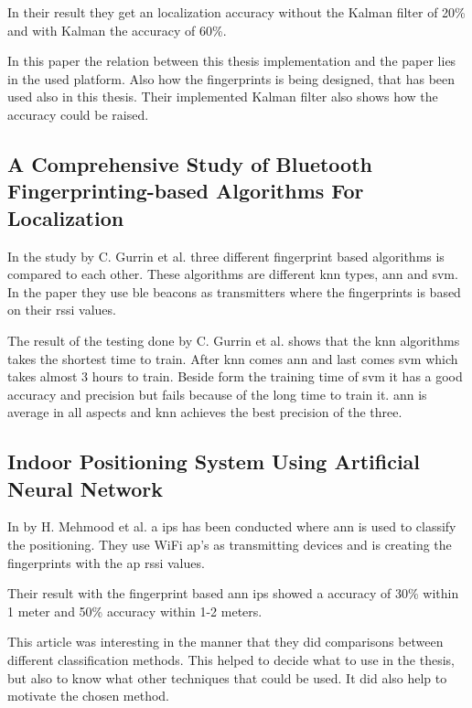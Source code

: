 \bigskip

In their result they get an localization accuracy without the Kalman filter of 20\% and with Kalman the accuracy of 60\%.

\bigskip

In this paper the relation between this thesis implementation and the paper lies in the used platform.
Also how the fingerprints is being designed, that has been used also in this thesis.
Their implemented Kalman filter also shows how the accuracy could be raised.


\subsection{A Comprehensive Study of Bluetooth Fingerprinting-based Algorithms For 
Localization}\label{sec:}
In the study \cite{ComprehensiveStudyBluetooth2013} by C. Gurrin et al. three different fingerprint based algorithms is compared to each other.
These algorithms are different \acrshort{knn} types, \acrfull{ann} and \acrfull{svm}.
In the paper they use \acrshort{ble} beacons as transmitters where the fingerprints is based on their \acrshort{rssi} values.

\bigskip

The result of the testing done by C. Gurrin et al. shows that the \acrshort{knn} algorithms takes the shortest time to train.
After \acrshort{knn} comes \acrshort{ann} and last comes \acrshort{svm}  which takes almost 3 hours to train.
Beside form the training time of \acrshort{svm}  it has a good accuracy and precision but fails because of the long time to train it.  \acrshort{ann} is average in all aspects and \acrshort{knn} achieves the best precision of the three.


\subsection{Indoor Positioning System Using Artificial Neural Network}\label{sec:}
In \cite{IndoorPositioningSystem2010} by H. Mehmood et al. a \acrshort{ips} has been conducted where \acrlong{ann} is used to classify the positioning.
They use WiFi \acrshort{ap}'s as transmitting devices and is creating the fingerprints with the \acrshort{ap} \acrshort{rssi} values.

\bigskip

Their result with the fingerprint based \acrshort{ann} \acrshort{ips} showed a accuracy of 30\% within 1 meter and 50\% accuracy within 1-2 meters.

\bigskip

This article was interesting in the manner that they did comparisons between different classification methods.
This helped to decide what to use in the thesis, but also to know what other techniques that could be used.
It did also help to motivate the chosen method.
